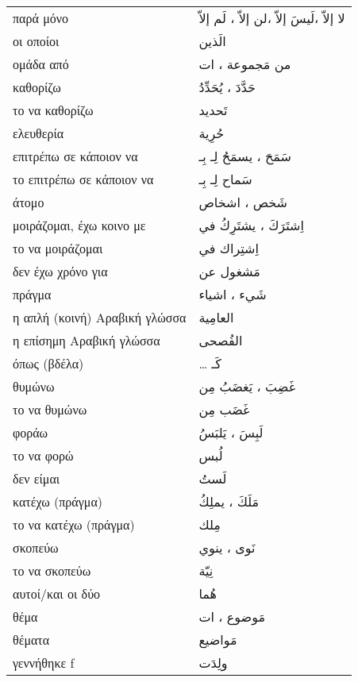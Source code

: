 \documentclass[twocolumn,a4paper]{article}
\newcommand{\ar}[1]{\textarabic{#1}}
\newcommand{\pl}{\raisebox{0.15ex}{\footnotesize ◍}}
\newcommand{\normpl}[1]{\ar{ #1، ات }}
\newcommand{\vrf}{\raisebox{0.15ex}{\footnotesize ◉}}
\newcommand{\vr}{\raisebox{0.15ex}{\footnotesize ◎}}
\newcommand{\mas}{\raisebox{0.15ex}{\footnotesize ◫}}
\begin{document}
\begin{mpsupertabular}{ P{0.5\textwidth} P{0.5\textwidth} }
παρά μόνο                    & \ar{ لا إلاّ ،لَيسَ إلاّ ،لن إلاّ ، لَم إلاّ } \\
οι οποίοι                    & \ar{ الَذين } \\
ομάδα από \pl                & \ar{من} \normpl{ مَجموعة } \\
καθορίζω \vrf                & \ar{ حَدَّدَ ، يُحَدِّدُ } \\ %
το να καθορίζω \mas          & \ar{ تَحديد } \\
ελευθερία                    & \ar{ حُرِية } \\
επιτρέπω σε κάποιον να \vrf  & \ar{ سَمَحَ ، يسمَحُ لِـ بِـ } \\
το επιτρέπω σε κάποιον να \mas & \ar{ سَماح لِـ بِـ } \\
άτομο \pl                    & \ar{ شَخص ، اشخاص } \\
μοιράζομαι, έχω κοινο με \vrf & \ar{ اِشتَرَكَ ، يشتَرِكُ في } \\ %
το να μοιράζομαι \mas        & \ar{ اِشتِراك في } \\
δεν έχω χρόνο για            & \ar{ مَشغول عن } \\
πράγμα \pl                   & \ar{ شَيء ، اشياء } \\
η απλή (κοινή) Αραβική γλώσσα & \ar{ العامِية } \\
η επίσημη Αραβική γλώσσα     & \ar{ الفُصحى } \\
όπως (βδέλα)                 & \ldots\ar{ كَـ } \\
θυμώνω \vrf                  & \ar{ غَضِبَ ، يَغضَبُ مِن }  \\ %
το να θυμώνω \mas            & \ar{ غَضَب مِن } \\
φοράω \vrf                   & \ar{ لَبِسَ ، يَلبَسُ } \\ %
το να φορώ \mas              & \ar{ لُبس } \\
δεν είμαι \vr                & \ar{ لَستُ } \\
κατέχω (πράγμα)  \vrf        & \ar{ مَلَكَ ، يملِكُ } \\
το να κατέχω (πράγμα) \mas   & \ar{ مِلك } \\
σκοπεύω \vrf                 & \ar{ نَوى ، ينوي } \\
το να σκοπεύω \mas           & \ar{ نِيّة } \\
αυτοί/και οι δύο             & \ar{ هُما } \\
θέμα \pl                     & \normpl{ مَوضوع } \\
θέματα                       & \ar{ مَواضيع } \\
γεννήθηκε f \vr              & \ar{ ولِدَت } \\


\end{mpsupertabular}
\end{document}

